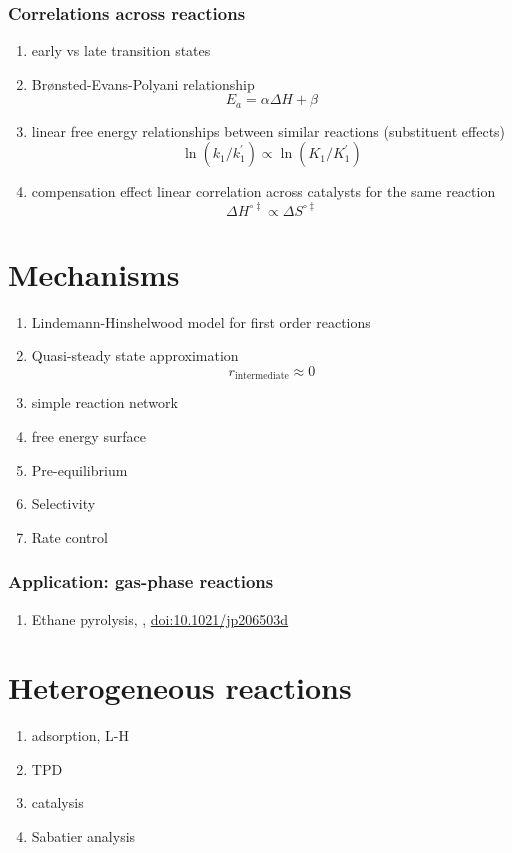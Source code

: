 \documentclass[11pt]{article}
\begin{document}
\subsubsection{Correlations across reactions}
\label{sec:orga764804}
\begin{enumerate}
\item early vs late transition states
\item Br\o{}nsted-Evans-Polyani relationship
\[ E_a = \alpha \Delta H + \beta \]
\item linear free energy relationships between similar reactions (substituent effects)
\[ \ln (k_1/k_1^\prime) \propto \ln (K_1/K_1^\prime) \]
\item compensation effect linear correlation across catalysts for the same reaction
\[\Delta H^{\circ\ddagger} \propto \Delta S^{\circ\ddagger}\]
\end{enumerate}
\section{Mechanisms}
\label{sec:org11fab28}
\begin{enumerate}
\item Lindemann-Hinshelwood model for first order reactions
\item Quasi-steady state approximation
\[ r_{\text{intermediate}} \approx 0 \]
\item simple reaction network
\item free energy surface
\item Pre-equilibrium
\item Selectivity
\item Rate control
\end{enumerate}
\subsubsection{Application: gas-phase reactions}
\label{sec:org58f417b}
\begin{enumerate}
\item Ethane pyrolysis, , \href{https://pubs.acs.org/doi/10.1021/jp206503d}{doi:10.1021/jp206503d}
\end{enumerate}

\section{Heterogeneous reactions}
\label{sec:org249651a}
\begin{enumerate}
\item adsorption, L-H
\item TPD
\item catalysis
\item Sabatier analysis
\end{enumerate}
\end{document}
